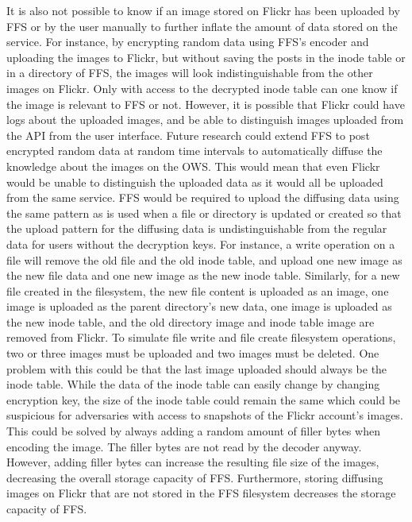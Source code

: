 It is also not possible to know if an image stored on Flickr has been uploaded by \gls{FFS} or by the user manually to further inflate the amount of data stored on the service. For instance, by encrypting random data using \gls{FFS}'s encoder and uploading the images to Flickr, but without saving the posts in the inode table or in a directory of \gls{FFS}, the images will look indistinguishable from the other images on Flickr. Only with access to the decrypted inode table can one know if the image is relevant to \gls{FFS} or not. However, it is possible that Flickr could have logs about the uploaded images, and be able to distinguish images uploaded from the \gls{API} from the user interface. Future research could extend \gls{FFS} to post encrypted random data at random time intervals to automatically diffuse the knowledge about the images on the \gls{OWS}. This would mean that even Flickr would be unable to distinguish the uploaded data as it would all be uploaded from the same service. \gls{FFS} would be required to upload the diffusing data using the same pattern as is used when a file or directory is updated or created so that the upload pattern for the diffusing data is undistinguishable from the regular data for users without the decryption keys. For instance, a write operation on a file will remove the old file and the old inode table, and upload one new image as the new file data and one new image as the new inode table. Similarly, for a new file created in the filesystem, the new file content is uploaded as an image, one image is uploaded as the parent directory's new data, one image is uploaded as the new inode table, and the old directory image and inode table image are removed from Flickr. To simulate file write and file create filesystem operations, two or three images must be uploaded and two images must be deleted. One problem with this could be that the last image uploaded should always be the inode table. While the data of the inode table can easily change by changing encryption key, the size of the inode table could remain the same which could be suspicious for adversaries with access to snapshots of the Flickr account's images. This could be solved by always adding a random amount of filler bytes when encoding the image. The filler bytes are not read by the decoder anyway. However, adding filler bytes can increase the resulting file size of the images, decreasing the overall storage capacity of \gls{FFS}. Furthermore, storing diffusing images on Flickr that are not stored in the \gls{FFS} filesystem decreases the storage capacity of \gls{FFS}.

